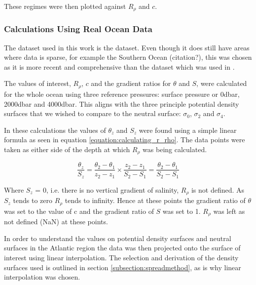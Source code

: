 These regimes were then plotted against $R_\rho$ and $c$. 

\subsubsection{Calculations Using Real Ocean Data}

The dataset used in this work is the \citet{WOCE2002} dataset. Even though it does still have areas where data is sparse, for example the Southern Ocean (citation?), this was chosen as it is more recent and comprehensive than the \citet{Levitus1982} dataset which was used in \citet{McDougall1987}.

The values of interest, $R_\rho$, $c$ and the gradient ratios for $\theta$ and $S$, were calculated for the whole ocean using three reference pressures: surface pressure or 0dbar, 2000dbar and 4000dbar. This aligns with the three principle potential density surfaces that we wished to compare to the neutral surface: $\sigma_0$, $\sigma_2$ and $\sigma_4$. 

In these calculations the values of $\theta_z$ and $S_z$ were found using a simple linear formula as seen in equation \ref{equation:calculating_r_rho}. The data points were taken as either side of the depth at which $R_\rho$ was being calculated. 

\begin{equation}
    \frac{\theta_z}{S_z} = \frac{\theta_2 - \theta_1}{z_2-z_1} \times \frac{z_2 - z_1}{S_2 - S_1} = \frac{\theta_2 - \theta_1}{S_2 - S_1}
    \label{equation:calculating_r_rho}
\end{equation}

Where $S_z$ = 0, i.e. there is no vertical gradient of salinity, $R_\rho$ is not defined. As $S_z$ tends to zero $R_\rho$ tends to infinity. Hence at these points the gradient ratio of $\theta$ was set to the value of c and the gradient ratio of $S$ was set to 1. $R_\rho$ was left as not defined (NaN) at these points. 

In order to understand the values on potential density surfaces and neutral surfaces in the Atlantic region the data was then projected onto the surface of interest using linear interpolation. The selection and derivation of the density surfaces used is outlined in section \ref{subsection:spreadmethod}, as is why linear interpolation was chosen. 



